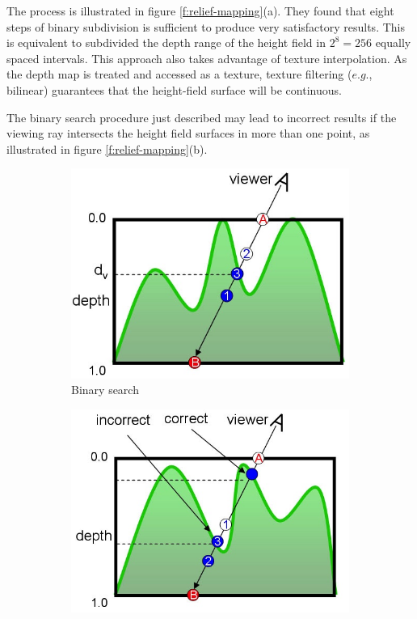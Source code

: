 The process is illustrated in figure \ref{f:relief-mapping}(a). They found that eight steps of binary subdivision is sufficient to produce very satisfactory results. This is equivalent to subdivided the depth range of the height field in $2^{8}=256$ equally spaced intervals. This approach also takes advantage of texture interpolation. As the depth map is treated and accessed as a texture, texture filtering ($e.g.$, bilinear) guarantees that the height-field surface will be continuous.

The binary search procedure just described may lead to incorrect results if the viewing ray intersects the height field surfaces in more than one point, as illustrated in figure \ref{f:relief-mapping}(b).

\begin{figure}\label{f:relief-mapping}
	\begin{subfigure}[t]{0.33\textwidth}
		\includegraphics[width=1.0\textwidth]{graphics/df/relief-mapping1}
		\caption{Binary search}
	\end{subfigure}
	\begin{subfigure}[t]{.33\textwidth}
		\includegraphics[width=1.0\textwidth]{graphics/df/relief-mapping2}

\end{subfigure}
\end{figure}
